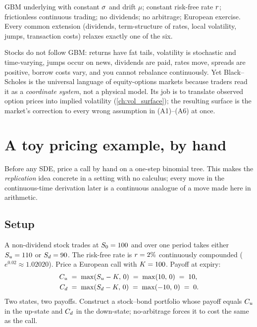 \begin{keyfactbox}
GBM underlying with constant $\sigma$ and drift $\mu$; constant
risk-free rate $r$; frictionless continuous trading; no
dividends; no arbitrage; European exercise. Every common
extension (dividends, term-structure of rates, local volatility,
jumps, transaction costs) relaxes exactly one of the six.
\end{keyfactbox}

\begin{pitfallbox}
Stocks do not follow GBM: returns have fat tails, volatility is
stochastic and time-varying, jumps occur on news, dividends are
paid, rates move, spreads are positive, borrow costs vary, and
you cannot rebalance continuously. Yet Black--Scholes is the
universal language of equity-options markets because traders
read it as a \emph{coordinate system}, not a physical model. Its
job is to translate observed option prices into implied
volatility (\cref{ch:vol_surface}); the resulting surface is the
market's correction to every wrong assumption in (A1)--(A6) at
once.
\end{pitfallbox}

\section{A toy pricing example, by hand}
\label{sec:ch15_binomial}

Before any SDE, price a call by hand on a one-step binomial
tree. This makes the \emph{replication} idea concrete in a
setting with no calculus; every move in the continuous-time
derivation later is a continuous analogue of a move made here in
arithmetic.

\subsection{Setup}
\label{subsec:ch15_binomial_setup}

A non-dividend stock trades at $S_0 = 100$ and over one
period takes either $S_u = 110$ or $S_d = 90$. The
risk-free rate is $r = 2\%$ continuously compounded
($e^{0.02} \approx 1.02020$). Price a European call with
$K = 100$. Payoff at expiry:
\begin{align}
  C_u \;&=\; \max(S_u - K,\, 0)
            \;=\; \max(10,\, 0) \;=\; 10, \nonumber \\
  C_d \;&=\; \max(S_d - K,\, 0)
            \;=\; \max(-10,\, 0) \;=\; 0.
  \label{eq:bin_payoffs}
\end{align}
Two states, two payoffs. Construct a stock--bond portfolio whose
payoff equals $C_u$ in the up-state and $C_d$ in the
down-state; no-arbitrage forces it to cost the same as the call.

